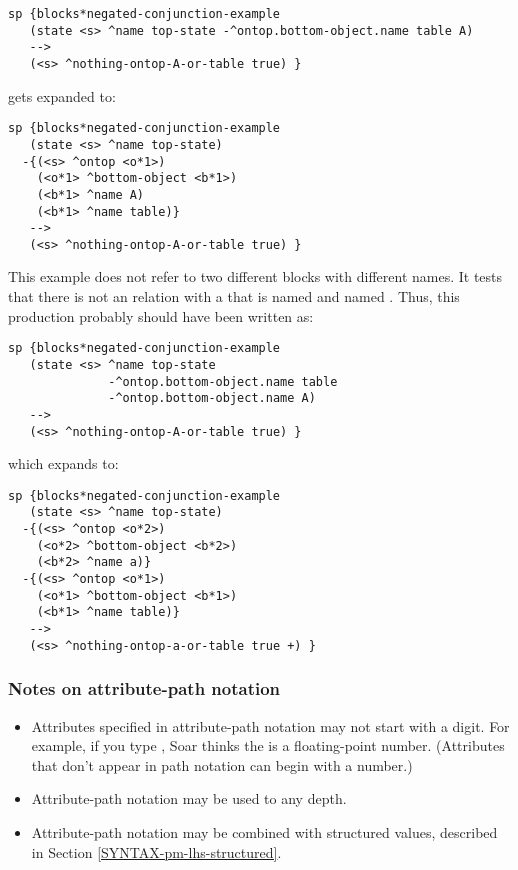 \begin{verbatim}
sp {blocks*negated-conjunction-example
   (state <s> ^name top-state -^ontop.bottom-object.name table A)
   -->
   (<s> ^nothing-ontop-A-or-table true) }
\end{verbatim}

gets expanded to:

\begin{verbatim}
sp {blocks*negated-conjunction-example
   (state <s> ^name top-state)
  -{(<s> ^ontop <o*1>)
    (<o*1> ^bottom-object <b*1>)
    (<b*1> ^name A)
    (<b*1> ^name table)}
   -->
   (<s> ^nothing-ontop-A-or-table true) }
\end{verbatim}

This example does not refer to two different blocks with different names. It tests that there is not an  relation with a  that is named  and named . Thus, this production probably should have been written as:

\begin{verbatim}
sp {blocks*negated-conjunction-example
   (state <s> ^name top-state 
              -^ontop.bottom-object.name table
              -^ontop.bottom-object.name A)
   -->
   (<s> ^nothing-ontop-A-or-table true) }
\end{verbatim}

which expands to: 

\begin{verbatim}
sp {blocks*negated-conjunction-example
   (state <s> ^name top-state)
  -{(<s> ^ontop <o*2>)
    (<o*2> ^bottom-object <b*2>)
    (<b*2> ^name a)}
  -{(<s> ^ontop <o*1>)
    (<o*1> ^bottom-object <b*1>)
    (<b*1> ^name table)}
   -->
   (<s> ^nothing-ontop-a-or-table true +) }
\end{verbatim}

\subsubsection*{Notes on attribute-path notation}

\vspace{-12pt}
\begin{itemize}
	\item 
		Attributes specified in attribute-path notation may not start with a digit. For example, if you type , Soar thinks the  is a floating-point number. (Attributes that don't appear in path notation can begin with a number.)
		\vspace{-6pt}
	\item 
		Attribute-path notation may be used to any depth.
		\vspace{-6pt}
	\item 
		Attribute-path notation may be combined with structured values, described in Section \ref{SYNTAX-pm-lhs-structured}.
		\vspace{-6pt}
\end{itemize}


